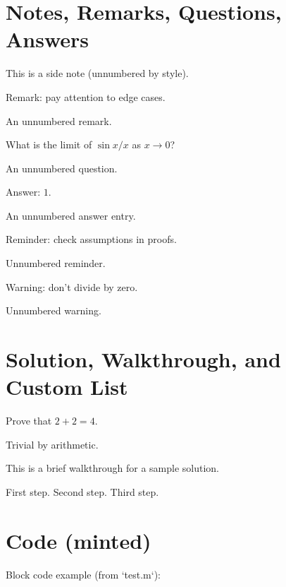 \documentclass{mudasir}
\begin{document}
\section*{Notes, Remarks, Questions, Answers}
\begin{note}
This is a side note (unnumbered by style).
\end{note}

\begin{remark}
Remark: pay attention to edge cases.
\end{remark}

\begin{remark*}
An unnumbered remark.
\end{remark*}

\begin{question}
What is the limit of $\sin x / x$ as $x\to0$?
\end{question}

\begin{question*}
An unnumbered question.
\end{question*}

\begin{answer}
Answer: $1$.
\end{answer}

\begin{answer*}
An unnumbered answer entry.
\end{answer*}

\begin{reminder}
Reminder: check assumptions in proofs.
\end{reminder}

\begin{reminder*}
Unnumbered reminder.
\end{reminder*}

\begin{warning}
Warning: don't divide by zero.
\end{warning}

\begin{warning*}
Unnumbered warning.
\end{warning*}

\section*{Solution, Walkthrough, and Custom List}
\begin{problem}
Prove that $2+2=4$.
\begin{soln}
Trivial by arithmetic.
\end{soln}
\end{problem}

\begin{walkthrough}
This is a brief walkthrough for a sample solution.
\end{walkthrough}

\begin{walk}
\ii First step.
\ii Second step.
\ii Third step.
\end{walk}

\section*{Code (minted)}
Block code example (from `test.m`):
\inputminted[frame=single, linenos]{matlab}{test.m}
\end{document}
